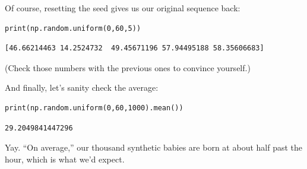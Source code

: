 Of course, resetting the seed gives us our original sequence back:

\begin{Verbatim}[fontsize=\small,samepage=true,frame=single,framesep=3mm]
print(np.random.uniform(0,60,5))
\end{Verbatim}
\vspace{-.2in}

\begin{Verbatim}[fontsize=\small,samepage=true,frame=leftline,framesep=5mm,framerule=1mm]
[46.66214463 14.2524732  49.45671196 57.94495188 58.35606683]
\end{Verbatim}

(Check those numbers with the previous ones to convince yourself.)

And finally, let's sanity check the average:

\begin{Verbatim}[fontsize=\small,samepage=true,frame=single,framesep=3mm]
print(np.random.uniform(0,60,1000).mean())                       
\end{Verbatim}
\vspace{-.2in}

\begin{Verbatim}[fontsize=\small,samepage=true,frame=leftline,framesep=5mm,framerule=1mm]
29.2049841447296
\end{Verbatim}

Yay. ``On average,'' our thousand synthetic babies are born at about half past
the hour, which is what we'd expect.

